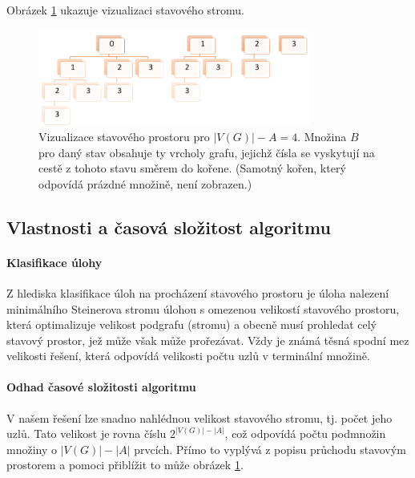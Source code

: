 \documentclass[12pt]{article}
\theoremstyle{definition}
\begin{document}
Obrázek \ref{imgStavy} ukazuje vizualizaci stavového stromu.
\begin{figure}[ht]
	\centering
	\includegraphics[width=0.8\textwidth]{obr/stavy.png}
	\caption{Vizualizace stavového prostoru pro $|V(G)|-A=4$. Množina $B$ pro daný stav obsahuje ty vrcholy grafu, jejichž čísla
		se vyskytují na cestě z tohoto stavu směrem do kořene. (Samotný kořen, který odpovídá prázdné množině, není zobrazen.)}
	\label{imgStavy}
\end{figure}
\subsection{Vlastnosti a časová složitost algoritmu}
\paragraph{Klasifikace úlohy}\mbox{}\newline
Z hlediska klasifikace úloh na procházení stavového prostoru je úloha nalezení minimálního
Steinerova stromu úlohou s omezenou velikostí stavového prostoru, která optimalizuje velikost podgrafu (stromu) a obecně musí prohledat celý stavový prostor, jež může však může prořezávat. Vždy je známá těsná spodní mez velikosti řešení, která odpovídá velikosti počtu uzlů v terminální množině.

\paragraph{Odhad časové složitosti algoritmu}\mbox{}\newline
V našem řešení lze snadno nahlédnou velikost stavového stromu, tj. počet jeho uzlů.
Tato velikost je rovna číslu $2^{|V(G)|-|A|}$, což odpovídá počtu podmnožin množiny o 
$|V(G)|-|A|$ prvcích. Přímo to vyplývá z popisu průchodu stavovým prostorem a pomoci přiblížit to může obrázek \ref{imgStavy}.
\end{document}

